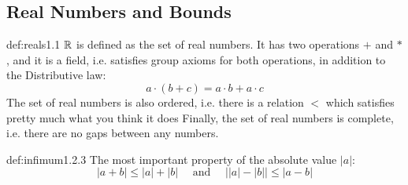 \documentclass[landscape, 8pt]{extarticle}
\begin{document}
\begin{multicols}{3}
\subsection*{Real Numbers and Bounds}
\begin{dfn}{def:reals}{1.1}
$\mathbb{R}$ is defined as the set of real numbers. It has two operations $+$ and $\ast$, and it is a field, i.e. satisfies group axioms for both operations, in addition to the Distributive law:
\[a\cdot(b+c) = a\cdot b + a\cdot c\]
The set of real numbers is also ordered, i.e. there is a relation $<$ which satisfies pretty much what you think it does
\vspace{0pt}\newline
Finally, the set of real numbers is complete, i.e. there are no gaps between any numbers.
\end{dfn}
\vspace{-5pt}

\begin{dfn}{def:infimum}{1.2.3}
    The most important property of the absolute value $\lvert a\rvert $:
    \[\lvert a+b\rvert \le \lvert a\rvert + \lvert b\rvert \quad\text{ and }\quad \lvert \lvert a\rvert - \lvert b\rvert \rvert \le \lvert a-b\rvert \]
\end{dfn}
\vspace{-5pt}


\end{multicols}
\end{document}
